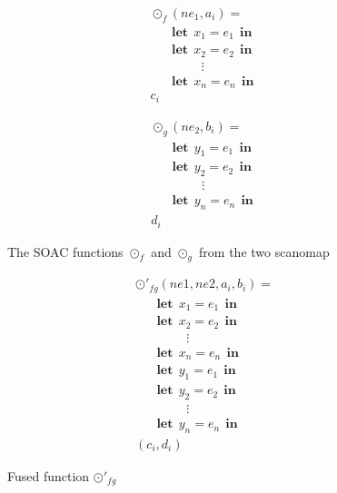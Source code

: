 \documentclass[11pt]{article}
\newcommand\lett{\phantom{-}\:\:\mathbf{let}\:\:}
\newcommand\inn{\:\:\mathbf{in}\:\:}
\begin{document}
 \begin{figure}[hb!]

   \begin{mdframed}
 \begin{minipage}{0.5\linewidth}
     \centering

       \begin{align*}
       &\odot_f(ne_1, a_i) = \\
       &\lett x_1 = e_1 \inn\\
       &\lett x_2 = e_2 \inn\\
       &\phantom{----}\vdots\\
       &\lett x_n = e_n \inn\\
       &c_i
       \end{align*}

     \label{fig:mapf}
 \end{minipage}
 \begin{minipage}{0.5\linewidth}
     \centering

     \begin{align*}
       &\odot_g(ne_2, b_i) = \\
       &\lett y_1 = e_1 \inn\\
       &\lett y_2 = e_2 \inn\\
       &\phantom{----}\vdots\\
       &\lett y_n = e_n \inn\\
       &d_i
     \end{align*}

     \label{fig:odotg}
   \end{minipage}

     \end{mdframed}
     \caption{The SOAC functions $\odot_f$ and $\odot_g$ from the two scanomap}
     \label{fig:pre-fusion}
\end{figure}
\clearpage
\begin{figure}[hb!]

   \begin{mdframed}
     \centering

       \begin{align*}
       &\odot'_{fg}(ne1, ne2, a_i, b_i ) = \\
       &\lett x_1 = e_1 \inn\\
       &\lett x_2 = e_2 \inn\\
       &\phantom{----}\vdots\\
       &\lett x_n = e_n \inn\\
       &\lett y_1 = e_1 \inn\\
       &\lett y_2 = e_2 \inn\\
       &\phantom{----}\vdots\\
       &\lett y_n = e_n \inn\\
       &(c_i, d_i)
       \end{align*}
       \end{mdframed}
     \caption{Fused function $\odot'_{fg}$}
     \label{fig:post-fusion}
\end{figure}
\end{document}

